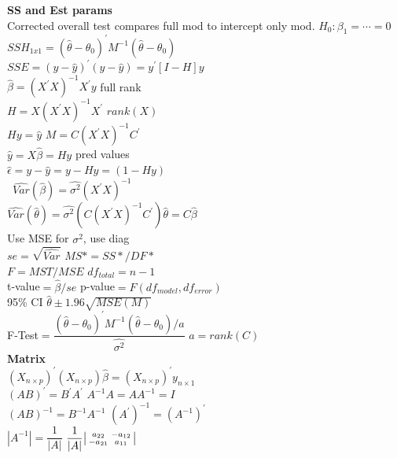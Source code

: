 \documentclass[10pt,landscape]{article}
\newenvironment{lsmallmatrix}
{\left|\begin{smallmatrix}}
	{\end{smallmatrix}\right|}
\newcommand{\B}{\beta}
\newcommand{\sg}{\sigma}
\newcommand{\hb}{\hat{\beta}}
\newcommand{\hth}{\hat{\theta}}
\begin{document}
\raggedright
\footnotesize
\begin{multicols*}{4}
\setlength{\premulticols}{1pt}
\setlength{\postmulticols}{1pt}
\setlength{\multicolsep}{1pt}
\setlength{\columnsep}{2pt}

\setlength{\columnseprule}{.25pt}
\setlength{\premulticols}{.25pt}
\setlength{\postmulticols}{.25pt}
\setlength{\multicolsep}{.25pt}
\setlength{\columnsep}{.25pt}
\textbf{SS and Est params}\\
 Corrected overall test compares full mod to intercept only mod. $H_0:\B_1=\cdots=0$\\
$SSH_{1x1}=(\hth-\theta_0)^{'}M^{-1}(\hth-\theta_0)$\\
$SSE=(y-\hat{y})^{'}(y-\hat{y})=y^{'}[I-H]y$\\
$\hb=(X^{'}X)^{-1}X^{'}y$ full rank\\
$H=X(X^{'}X)^{-1}X^{'}$ $rank(X)$\\
$Hy=\hat{y}$\quad
$M=C(X^{'}X)^{-1}C^{'}$\\
$\hat{y}=X\hb=Hy$ pred values\\
$\hat{\epsilon}=y-\hat{y}=y-Hy=(1-Hy)$\\\
$\hat{Var}(\hb)=\hat{\sg^2}(X^{'}X)^{-1}$ \\
$\hat{Var}(\hth)=\hat{\sg^2}(C(X^{'}X)^{-1}C^{'})$\quad $\hth=C\hb$\\
Use MSE for $\hat{\sg^2}$, use diag\\
$se=\sqrt{\hat{Var}}$\quad
$MS*=SS*/DF*$\\
$F=MST/MSE$\quad
$df_{total}=n-1$\\
t-value$=\hb/se$\quad
p-value$=F(df_{model},df_{error})$\\
95\% CI  $\hth\pm 1.96\sqrt{MSE(M)}$\\
F-Test$=\dfrac{(\hth-\theta_0)^{'}M^{-1}(\hth-\theta_0)/a}{\hat{\sg^2}}$ $a=rank(C)$\\
\textbf{Matrix}\\
$(X_{n\times p})^{'}(X_{n \times p})\hb=(X_{n\times p})^{'}y_{n\times 1}$ \\
$(AB)^{'}=B^{'}A^{'}$\quad
$A^{-1}A=AA^{-1}=I$\\
$(AB)^{-1}=B^{-1}A^{-1}$\quad
$(A^{'})^{-1}=(A^{-1})^{'}$\\
$|A^{-1}|=\dfrac{1}{|A|}$\quad
$\dfrac{1}{|A|}
\begin{lsmallmatrix}
a_{22}&-a_{12}\\
-a_{21}& a_{11}
\end{lsmallmatrix}$\\

\end{multicols*}
\end{document}
